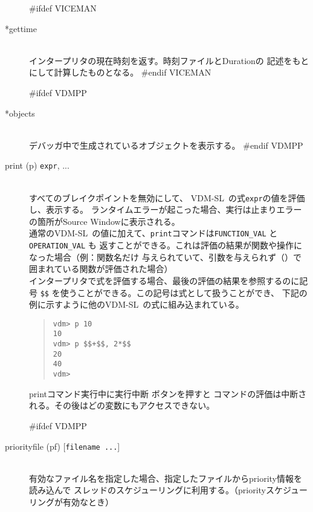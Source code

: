 \documentclass[\pformat,12pt]{article}
\newcommand{\vdmslpp}{VDM-SL}
\newcommand{\vdmslpp}{VDM++}
\newcommand{\guicmd}[1]{{\sf #1}}
\newcommand{\guicmd}[1]{{\gt #1}}
\begin{document}
\begin{description}
#ifdef VICEMAN
\item[*gettime]\mbox{}\\
  インタープリタの現在時刻を返す。時刻ファイルとDurationの
  記述をもとにして計算したものとなる。
#endif VICEMAN

#ifdef VDMPP
\item[*objects] \mbox{}\\
  デバッガ中で生成されているオブジェクトを表示する。
#endif VDMPP


\item[print (p) {\tt expr}, ...] \mbox{}\\
  すべてのブレイクポイントを無効にして、 \vdmslpp\ の式{\tt expr}の値を評価し、表示する。
  ランタイムエラーが起こった場合、実行は止まりエラーの箇所が\guicmd{Source Window}に表示される。\\
  
  通常の\vdmslpp\ の値に加えて、{\tt print}コマンドは{\tt FUNCTION\_VAL}  と{\tt OPERATION\_VAL} も
  返すことができる。これは評価の結果が関数や操作になった場合（例：関数名だけ
  与えられていて、引数を与えられず（）で囲まれている関数が評価された場合）\\
  
  インタープリタで式を評価する場合、最後の評価の結果を参照するのに記号
   {\tt \$\$}\index{\$\$} を使うことができる。この記号は式として扱うことができ、
  下記の例に示すように他の\vdmslpp\ の式に組み込まれている。

\begin{quote}
\begin{verbatim}
vdm> p 10
10
vdm> p $$+$$, 2*$$
20
40
vdm> 
\end{verbatim}
\end{quote}

  printコマンド実行中に\guicmd{実行中断} ボタンを押すと
  コマンドの評価は中断される。その後はどの変数にもアクセスできない。
  
#ifdef VDMPP
\item[priorityfile (pf) \mbox{[{\tt filename ...}]}]
  \mbox{}\\
  有効なファイル名を指定した場合、指定したファイルからpriority情報を読み込んで
  スレッドのスケジューリングに利用する。（priorityスケジューリングが有効なとき）\\


\end{description}
\end{document}
